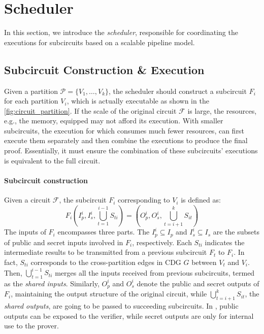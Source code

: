 
\section{Scheduler} \label{sec:scheduler}
In this section, we introduce the \emph{scheduler}, responsible for 
coordinating the executions for subcircuits based on a scalable pipeline model. 

\vspace{-3pt}
\subsection{Subcircuit Construction \& Execution}
Given a partition $\mathcal{P}=\{V_1, \ldots, V_k\}$, the scheduler should construct a subcircuit $F_i$ for each partition $V_i$, which is actually executable as shown in the \cref{fig:circuit_partition}. If the scale of the original circuit $\mathcal{F}$ is large, the resources, e.g., the memory, equipped may not afford its execution. With smaller subcircuits, the execution for which consumes much fewer resources, \system can first execute them separately and then combine the executions to produce the final proof. 
Essentially, it must ensure the combination of these subcircuits' executions is equivalent to the full circuit. 



\paragraph{Subcircuit construction} Given a \zk circuit $\mathcal{F}$, the subcircuit $F_i$ corresponding to $V_i$ is defined as:
$$
F_i\left(I_p^i, I_s^i, \bigcup_{t=1}^{i-1}{S_{ti}}\right) = \left(O_p^i, O_s^i, \bigcup_{t=i+1}^{k}{S_{it}}\right)
$$
\noindent The inputs of $F_i$ encompasses three parts. The $I_p^i\subseteq I_p$ and $I_s^i\subseteq I_s$ are the subsets of public and secret inputs involved in $F_i$, respectively. Each $S_{ti}$ indicates the intermediate results to be transmitted from a previous subcircuit $F_t$ to $F_i$. In fact, $S_{ti}$ corresponds to the cross-partition edges in CDG $G$ between $V_t$ and $V_i$. 
Then,  $\bigcup_{t=1}^{i-1}{S_{ti}}$ merges all the inputs received from previous subcircuits, termed as the \emph{shared inputs}. Similarly,  $O_p^i$ and $O_s^i$ denote the public and secret outputs of $F_i$, maintaining the output structure of the original circuit, while $\bigcup_{t=i+1}^{k}{S_{it}}$, the \emph{shared outputs}, are going to be passed to succeeding subcircuits. In \system, public outputs can be exposed to the verifier, while secret outputs are only for internal use to the prover. 




